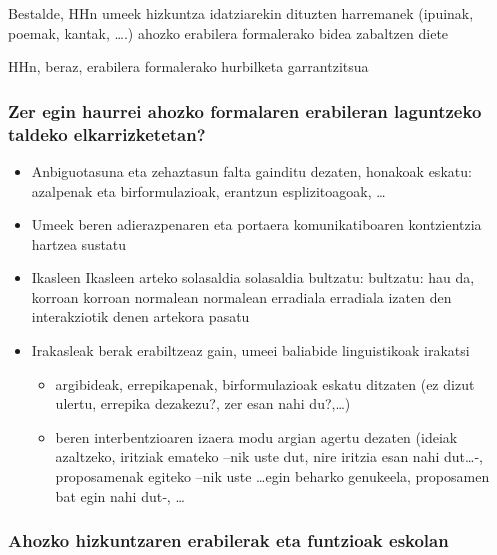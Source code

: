 \documentclass[
]{book}
\providecommand{\tightlist}{%
  \setlength{\itemsep}{0pt}\setlength{\parskip}{0pt}}
\begin{document}
Bestalde, HHn umeek hizkuntza idatziarekin dituzten harremanek (ipuinak, poemak, kantak, \ldots.) ahozko erabilera formalerako bidea zabaltzen diete

HHn, beraz, erabilera formalerako hurbilketa garrantzitsua

\hypertarget{zer-egin-haurrei-ahozko-formalaren-erabileran-laguntzeko-taldeko-elkarrizketetan}{%
\subsubsection{Zer egin haurrei ahozko formalaren erabileran laguntzeko taldeko elkarrizketetan?}\label{zer-egin-haurrei-ahozko-formalaren-erabileran-laguntzeko-taldeko-elkarrizketetan}}

\begin{itemize}
\tightlist
\item
  Anbiguotasuna eta zehaztasun falta gainditu dezaten, honakoak eskatu:
  azalpenak eta birformulazioak, erantzun esplizitoagoak, \ldots{}
\item
  Umeek beren adierazpenaren eta portaera komunikatiboaren kontzientzia hartzea sustatu
\item
  Ikasleen Ikasleen arteko solasaldia solasaldia bultzatu: bultzatu: hau da, korroan korroan normalean normalean erradiala erradiala izaten den interakziotik denen artekora pasatu
\item
  Irakasleak berak erabiltzeaz gain, umeei baliabide linguistikoak irakatsi

  \begin{itemize}
  \tightlist
  \item
    argibideak, errepikapenak, birformulazioak eskatu ditzaten (ez dizut ulertu, errepika dezakezu?, zer esan nahi du?,\ldots)
  \item
    beren interbentzioaren izaera modu argian agertu dezaten (ideiak azaltzeko, iritziak emateko --nik uste dut, nire iritzia esan nahi dut\ldots‐, proposamenak egiteko --nik uste \ldots egin beharko genukeela, proposamen bat egin nahi dut‐, \ldots{}
  \end{itemize}
\end{itemize}

\hypertarget{ahozko-hizkuntzaren-erabilerak-eta-funtzioak-eskolan}{%
\subsubsection{Ahozko hizkuntzaren erabilerak eta funtzioak eskolan}\label{ahozko-hizkuntzaren-erabilerak-eta-funtzioak-eskolan}}
\end{document}
